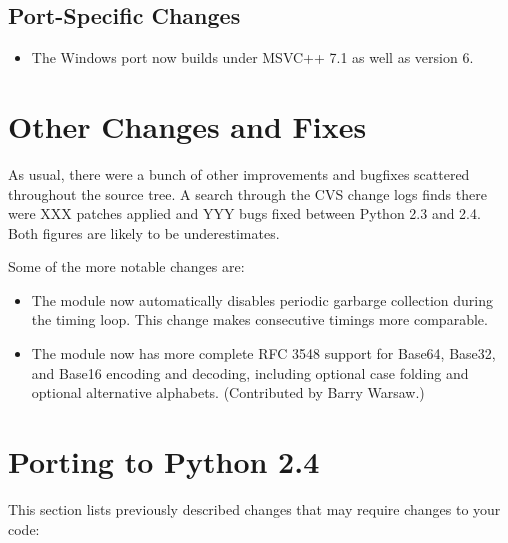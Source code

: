 \documentclass{howto}
\begin{document}
\subsection{Port-Specific Changes}

\begin{itemize}

\item The Windows port now builds under MSVC++ 7.1 as well as version 6.

\end{itemize}


\section{Other Changes and Fixes \label{section-other}}

As usual, there were a bunch of other improvements and bugfixes
scattered throughout the source tree.  A search through the CVS change
logs finds there were XXX patches applied and YYY bugs fixed between
Python 2.3 and 2.4.  Both figures are likely to be underestimates.

Some of the more notable changes are:

\begin{itemize}

\item The  module now automatically disables periodic
  garbarge collection during the timing loop.  This change makes
  consecutive timings more comparable.

\item The  module now has more complete RFC 3548 support
  for Base64, Base32, and Base16 encoding and decoding, including
  optional case folding and optional alternative alphabets.
  (Contributed by Barry Warsaw.)

\end{itemize}


\section{Porting to Python 2.4}

This section lists previously described changes that may require
changes to your code:
\end{document}
